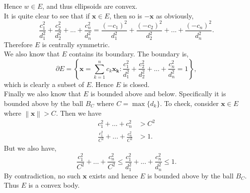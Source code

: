\documentclass[a4paper]{article}
\newcommand{\norm}[1]{\left\lVert#1\right\rVert}
\begin{document}
\begin{enumerate}[leftmargin=\labelsep]
		Hence $w \in E$, and thus ellipsoids are convex. \\ [2mm]
		It is quite clear to see that if $\bm{x} \in E$, then so is $-\bm{x}$ as obviously,
		$$\frac{c_1^2}{d_1^2} + \frac{c_2^2}{d_2^2} + ... + \frac{c_n^2}{d_n^2} =  \frac{(-c_1)^2}{d_1^2} + \frac{(-c_2)^2}{d_2^2} + ... + \frac{(-c_n)^2}{d_n^2}.$$
		Therefore $E$ is centrally symmetric. \\ [2mm]
		We also know that $E$ contains its boundary. The boundary is,
		$$\partial E = \left\{ \bm{x} = \sum_{k = 1}^n c_k \bm{x_k} : \frac{c_1^2}{d_1^2} + \frac{c_2^2}{d_2^2} + ... + \frac{c_n^2}{d_n^2} = 1 \right\},$$
		which is clearly a subset of $E$. Hence $E$ is closed. \\ [2mm]
		Finally we also know that $E$ is bounded above and below. Specifically it is bounded above by the ball $B_C$ where $C = \max\{d_k\}$. To check, consider $\bm{x} \in E$ where $\norm{\bm{x}} > C$. Then we have
		\begin{align*}
			c_1^2 + ... + c_n^2 & > C^2 \\
			\frac{c_1^2}{C^2} + ... + \frac{c_n^2}{C^2} & > 1.
		\end{align*}
		But we also have,
		$$\frac{c_1^2}{C^2} + ... + \frac{c_n^2}{C^2} \leq \frac{c_1^2}{d_1^2} + ... + \frac{c_n^2}{d_n^2} \leq 1.$$
		By contradiction, no such $\bm{x}$ exists and hence $E$ is bounded above by the ball $B_C$. \\ [2mm]
		Thus $E$ is a convex body.


\end{enumerate}
\end{document}
